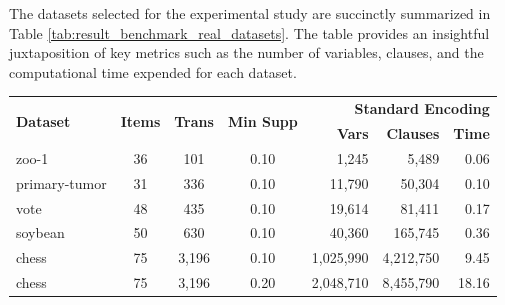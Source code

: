 The datasets selected for the experimental study are succinctly summarized
in Table \ref{tab:result_benchmark_real_datasets}.
The table provides an insightful juxtaposition of key metrics such as the number of variables,
clauses, and the computational time expended for each dataset.

\begin{table}[H]
    \centering
    \begin{tabular}{|l|c|c|c|r|r|r|}
        \hline
        \multirow{2}{*}{\textbf{Dataset}} & \multirow{2}{*}{\textbf{Items}} & \multirow{2}{*}{\textbf{Trans}} & \multirow{2}{*}{\textbf{Min Supp}} & \multicolumn{3}{r|}{\textbf{Standard Encoding}}                                    \\ \cline{5-7}
                                          &                                 &                                 &                                    & \textbf{Vars}                                   & \textbf{Clauses} & \textbf{Time} \\ \hline
        zoo-1                             & 36                              & 101                             & 0.10                               & 1,245                                           & 5,489            & 0.06          \\
        primary-tumor                     & 31                              & 336                             & 0.10                               & 11,790                                          & 50,304           & 0.10          \\
        vote                              & 48                              & 435                             & 0.10                               & 19,614                                          & 81,411           & 0.17          \\
        soybean                           & 50                              & 630                             & 0.10                               & 40,360                                          & 165,745          & 0.36          \\
        chess                             & 75                              & 3,196                           & 0.10                               & 1,025,990                                       & 4,212,750        & 9.45          \\
        chess                             & 75                              & 3,196                           & 0.20                               & 2,048,710                                       & 8,455,790        & 18.16         \\

\end{tabular}
\end{table}
